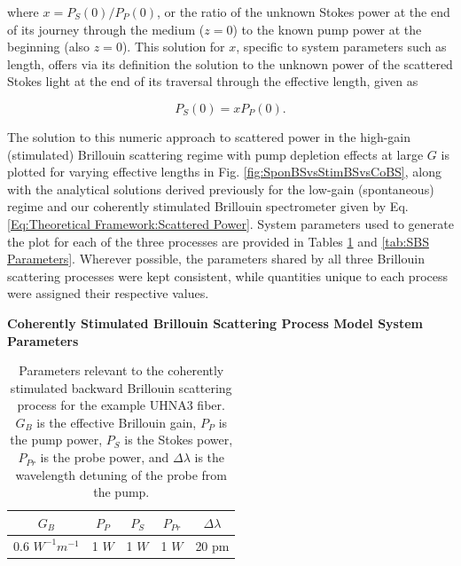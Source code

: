 where $x = P_S(0)/P_P(0)$, or the ratio of the unknown Stokes power at the end of its journey through the medium ($z=0$) to the known pump power at the beginning (also $z=0$). This solution for $x$, specific to system parameters such as length, offers via its definition the solution to the unknown power of the scattered Stokes light at the end of its traversal through the effective length, given as

\begin{equation}
  P_S(0) = xP_{P}(0).
\end{equation}

The solution to this numeric approach to scattered power in the high-gain (stimulated) Brillouin scattering regime with pump depletion effects at large $G$ is plotted for varying effective lengths in Fig. \ref{fig:SponBSvsStimBSvsCoBS}, along with the analytical solutions derived previously for the low-gain (spontaneous) regime and our coherently stimulated Brillouin spectrometer given by Eq. \ref{Eq:Theoretical Framework:Scattered Power}. System parameters used to generate the plot for each of the three processes are provided in Tables \ref{tab:CoBS Parameters} and \ref{tab:SBS Parameters}. Wherever possible, the parameters shared by all three Brillouin scattering processes were kept consistent, while quantities unique to each process were assigned their respective values.

\begin{table}[ht]
  \centering
  \textbf{Coherently Stimulated Brillouin Scattering Process Model System Parameters}
  \renewcommand{\arraystretch}{1.2}
  \begin{tabular}{|c|c|c|c|c|}
    \hline
    $G_{B}$ & $P_{P}$ & $P_{S}$ & $P_{Pr}$ & $\Delta\lambda$ \\
    \hline
    0.6 $W^{-1} m^{-1}$ & 1 $W$ & 1 $W$ & 1 $W$ & 20 pm \\
    \hline
  \end{tabular}
  \caption{Parameters relevant to the coherently stimulated backward Brillouin scattering process for the example UHNA3 fiber. $G_{B}$ is the effective Brillouin gain, $P_{P}$ is the pump power, $P_{S}$ is the Stokes power, $P_{Pr}$ is the probe power, and $\Delta\lambda$ is the wavelength detuning of the probe from the pump.}
  \label{tab:CoBS Parameters}
\end{table}

